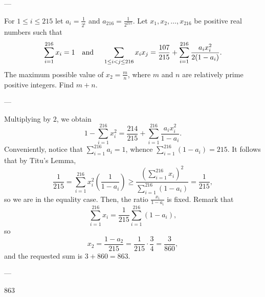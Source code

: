 
---

For $1\leq i\leq 215$ let $a_i=\frac{1}{2^i}$ and $a_{216}=\frac{1}{2^{215}}$. Let $x_1,x_2,\ldots,x_{216}$ be positive real numbers such that \[ \sum\limits_{i=1}^{216} x_i=1 \text{\quad and \quad} \sum\limits_{1\leq i<j \leq 216} x_ix_j = \frac{107}{215}+ \sum\limits_{i=1}^{216} \frac{a_ix_i^2}{2(1-a_i)}.\]The maximum possible value of $x_2=\frac{m}{n}$, where $m$ and $n$ are relatively prime positive integers. Find $m+n$.

---

Multiplying by $2$, we obtain \[1-\sum_{i=1}^{216}x_i^2=\frac{214}{215}+\sum_{i=1}^{216}\frac{a_ix_i^2}{1-a_i}.\]
Conveniently, notice that $\sum_{i=1}^{216}a_i=1$, whence $\sum_{i=1}^{216}(1-a_i)=215$. It follows that by Titu's Lemma, \[\frac1{215}=\sum_{i=1}^{216}x_i^2\left(\frac1{1-a_i}\right)\ge\frac{\left(\displaystyle\sum_{i=1}^{216}x_i\right)^2}{\displaystyle\sum_{i=1}^{216}(1-a_i)}=\frac1{215},\]
so we are in the equality case. Then, the ratio $\frac{x_i}{1-a_i}$ is fixed. Remark that \[\sum_{i=1}^{216}x_i=\frac1{215}\sum_{i=1}^{216}(1-a_i),\]
so \[x_2=\frac{1-a_2}{215}=\frac1{215}\cdot\frac34=\frac3{860},\]
and the requested sum is $3+860=863$.

---

863
